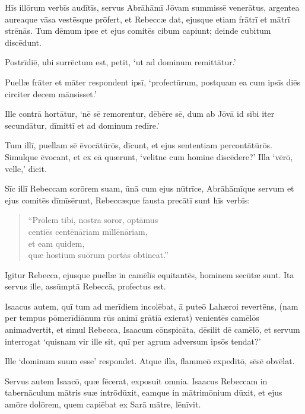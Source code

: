 \Versus Hīs illōrum verbīs audītīs, servus Abrāhāmī Jōvam summissē venerātus,
\Versus argentea aureaque vāsa vestēsque prōfert, et Rebeccæ dat, ejusque etiam frātrī et mātrī strēnās.
\Versus Tum dēmum ipse et ejus comitēs cibum capiunt; deinde cubitum discēdunt.

Postrīdiē, ubi surrēctum est, petit, `ut ad dominum remittātur.'

\Versus Puellæ frāter et māter respondent ipsī, `profectūrum, postquam ea cum ipsīs diēs circiter decem mānsisset.'

\Versus Ille contrā hortātur, `nē sē remorentur, dēbēre sē, dum ab Jōvā id sibi iter secundātur, dīmittī et ad dominum redīre.'

\Versus Tum illī, puellam sē ēvocātūrōs, dīcunt, et ejus sententiam percontātūrōs.
\Versus Simulque ēvocant, et ex eā quærunt, `velitne cum homine discēdere?' Illa `vērō, velle,' dīcit.

\Versus Sīc illī Rebeccam sorōrem suam, ūnā cum ejus nūtrīce, Abrāhāmīque servum et ejus comitēs dīmīsērunt,
\Versus Rebeccæque fausta precātī sunt hīs verbīs:

\begin{verse}
\begin{patverse*}
 ``Prōlem tibi, nostra soror, optāmus\\
 centiēs centēnāriam mīllēnāriam,\\
 et eam quidem,\\
 quæ hostium suōrum portās obtineat.''
\end{patverse*}
\end{verse}

\Versus Igitur Rebecca, ejusque puellæ in camēlīs equitantēs, hominem secūtæ sunt. Ita servus ille, assūmptā Rebeccā, profectus est.

\Versus Isaacus autem, quī tum ad merīdiem incolēbat, ā puteō Lahæroi revertēns,
\Versus (nam per tempus pōmerīdiānum rūs animī grātiā exierat) venientēs camēlōs animadvertit,
\Versus et simul Rebecca, Isaacum cōnspicāta, dēsilit dē camēlō,
\Versus et servum interrogat `quisnam vir ille sit, quī per agrum adversum ipsōs tendat?'

Ille `dominum suum esse' respondet. Atque illa, flammeō expedītō, sēsē obvēlat.

\Versus Servus autem Isaacō, quæ fēcerat, exposuit omnia.
\Versus Isaacus Rebeccam in tabernāculum mātris suæ intrōdūxit, eamque in mātrimōnium dūxit,
\Versus et ejus amōre dolōrem, quem capiēbat ex Sarā mātre, lēnīvit.




